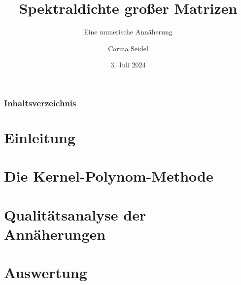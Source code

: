\documentclass{beamer}
\title{Spektraldichte großer Matrizen}
\subtitle{Eine numerische Annäherung}
\author{Carina Seidel}
\institute[Universität Potsdam]{Universität Potsdam}
\date[3. Juli 2024]{3. Juli 2024}
\newcommand{\1}{\mathds{1}}
\begin{document}
\begin{frame}
\titlepage
\end{frame}
\begin{frame}
\frametitle{Inhaltsverzeichnis}
\tableofcontents
\end{frame}

\section{Einleitung}



\section{Die Kernel-Polynom-Methode}



\section{Qualitätsanalyse der Annäherungen}



\section{Auswertung}
\end{document}
